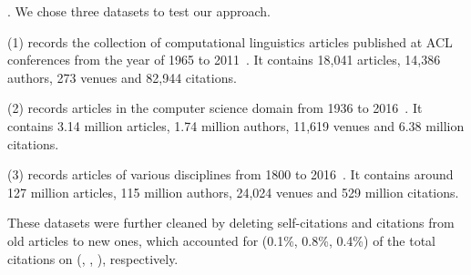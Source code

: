 . We chose three datasets to test our approach.

\noindent
(1) \aan records the collection of computational linguistics articles published at ACL conferences from the year of 1965 to 2011~\cite{Liang16AAAI}.
It contains 18,041 articles, 14,386 authors, 273 venues and 82,944 citations.

\noindent
(2) \aminer records articles in the computer science domain from 1936 to 2016~\cite{Tang:08KDD}.
It contains 3.14 million articles, 1.74 million authors, 11,619 venues and 6.38 million citations.

\noindent
(3) \magdata records articles of various disciplines from 1800 to 2016~\cite{Sinha15:MAG}.
It contains around 127 million articles, 115 million authors, 24,024 venues and 529 million citations.

These datasets were further cleaned by deleting self-citations and citations from old articles to new ones, which accounted for (0.1\%, 0.8\%, 0.4\%) of the total citations on (\aan, \aminer, \magdata), respectively.





